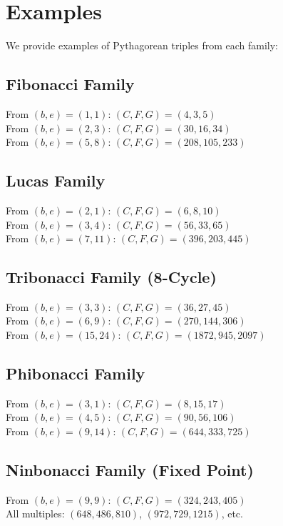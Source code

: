 \documentclass[12pt]{article}
\begin{document}
\section{Examples}

We provide examples of Pythagorean triples from each family:

\subsection{Fibonacci Family}
From $(b, e) = (1, 1)$: $(C, F, G) = (4, 3, 5)$\\
From $(b, e) = (2, 3)$: $(C, F, G) = (30, 16, 34)$\\
From $(b, e) = (5, 8)$: $(C, F, G) = (208, 105, 233)$

\subsection{Lucas Family}
From $(b, e) = (2, 1)$: $(C, F, G) = (6, 8, 10)$\\
From $(b, e) = (3, 4)$: $(C, F, G) = (56, 33, 65)$\\
From $(b, e) = (7, 11)$: $(C, F, G) = (396, 203, 445)$

\subsection{Tribonacci Family (8-Cycle)}
From $(b, e) = (3, 3)$: $(C, F, G) = (36, 27, 45)$\\
From $(b, e) = (6, 9)$: $(C, F, G) = (270, 144, 306)$\\
From $(b, e) = (15, 24)$: $(C, F, G) = (1872, 945, 2097)$

\subsection{Phibonacci Family}
From $(b, e) = (3, 1)$: $(C, F, G) = (8, 15, 17)$\\
From $(b, e) = (4, 5)$: $(C, F, G) = (90, 56, 106)$\\
From $(b, e) = (9, 14)$: $(C, F, G) = (644, 333, 725)$

\subsection{Ninbonacci Family (Fixed Point)}
From $(b, e) = (9, 9)$: $(C, F, G) = (324, 243, 405)$\\
All multiples: $(648, 486, 810)$, $(972, 729, 1215)$, etc.
\end{document}
